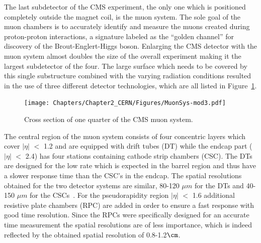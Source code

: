 The last subdetector of the CMS experiment, the only one which is positioned completely outside the magnet coil, is the muon system. The sole goal of the muon chambers is to accurately identify and measure the muons created during proton-proton interactions, a signature labeled as the ``golden channel'' for discovery of the Brout-Englert-Higgs boson. %
Enlarging the CMS detector with the muon system almost doubles the size of the overall experiment making it the largest subdetector of the four. 
The large surface which needs to be covered by this single substructure combined with the varying radiation conditions resulted in the use of three different detector technologies, which are all listed in Figure~\ref{fig::MuonAndCMS}.
\begin{figure}[h!t]
 \centering
 \texttt{[image: Chapters/Chapter2\_CERN/Figures/MuonSys-mod3.pdf]}
 \caption{Cross section of one quarter of the CMS muon system.} \label{fig::MuonAndCMS}
\end{figure}

The central region of the muon system consists of four concentric layers which cover $\vert \eta \vert$ $<$ 1.2 and are equipped with drift tubes (DT) while the endcap part ($\vert \eta \vert$ $<$ 2.4) has four stations containing cathode strip chambers (CSC). The DTs are designed for the low rate which is expected in the barrel region and thus have a slower response time than the CSC's in the endcap. 
The spatial resolutions obtained for the two detector systems are similar, 80-120 $\unit{\mu m}$ for the DTs and 40-150 $\unit{\mu m}$ for the CSCs~\cite{MuonPerformance}.
For the pseudorapidity region $\vert \eta \vert$ $<$ 1.6 additional resistive plate chambers (RPC) are added in order to ensure a fast response with good time resolution. Since the RPCs were specifically designed for an accurate time measurement the spatial resolutions are of less importance, which is indeed reflected by the obtained spatial resolution of 0.8-1.2$\cm$. %

